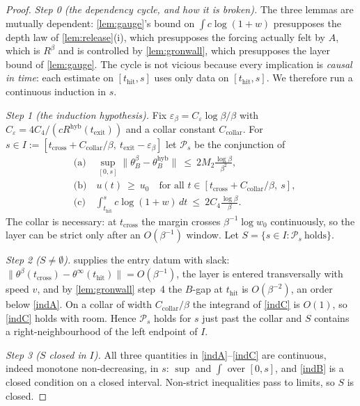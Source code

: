 \documentclass[11pt]{article}
\theoremstyle{definition}
\theoremstyle{remark}
\newcommand{\hyb}{\mathrm{hyb}}
\newcommand{\thit}{t_{\mathrm{hit}}}
\newcommand{\texit}{t_{\mathrm{exit}}}
\newcommand{\tcross}{t_{\mathrm{cross}}}
\begin{document}
\begin{proof}
\emph{Step 0 (the dependency cycle, and how it is broken).} The three lemmas are
mutually dependent: \cref{lem:gauge}'s bound on $\int c\log(1+w)$ presupposes the
depth law of \cref{lem:release}(i), which presupposes the forcing actually felt
by $A$, which is $R^\beta$ and is controlled by \cref{lem:gronwall}, which
presupposes the layer bound of \cref{lem:gauge}. The cycle is not vicious because
every implication is \emph{causal in time}: each estimate on $[\thit,s]$ uses only
data on $[\thit,s]$. We therefore run a continuous induction in $s$.

\emph{Step 1 (the induction hypothesis).} Fix
$\varepsilon_\beta=C_\varepsilon\log\beta/\beta$ with
$C_\varepsilon=4C_4/(cR^{\hyb}(\texit))$ and a collar constant
$C_{\mathrm{collar}}$. For
$s\in I:=[\tcross+C_{\mathrm{collar}}/\beta,\ \texit-\varepsilon_\beta]$ let
$\mathcal P_s$ be the conjunction of
\begin{align}
&\text{(a)}\quad \sup_{[0,s]}\|\theta_B^\beta-\theta_B^{\hyb}\|
\ \le\ 2M_2\frac{\log\beta}{\beta^2},
\tag{a}\label{indA}\\
&\text{(b)}\quad u(t)\ \ge\ u_0\quad\text{for all }
t\in[\tcross+C_{\mathrm{collar}}/\beta,\ s],
\tag{b}\label{indB}\\
&\text{(c)}\quad \int_{\thit}^{s}c\log(1+w)\,dt\ \le\ 2C_4\frac{\log\beta}{\beta}.
\tag{c}\label{indC}
\end{align}
The collar is necessary: at $\tcross$ the margin crosses $\beta^{-1}\log w_0$
continuously, so the layer can be strict only after an $O(\beta^{-1})$ window.
Let $S=\{s\in I:\mathcal P_s\ \text{holds}\}$.

\emph{Step 2 ($S\neq\emptyset$).}  supplies the entry datum
with slack: $\|\theta^\beta(\tcross)-\theta^\infty(\thit)\|=O(\beta^{-1})$, the
layer is entered transversally with speed $v$, and by \cref{lem:gronwall}
step~4 the $B$-gap at $\thit$ is $O(\beta^{-2})$, an order below \eqref{indA}.
On a collar of width $C_{\mathrm{collar}}/\beta$ the integrand of \eqref{indC} is
$O(1)$, so \eqref{indC} holds with room. Hence $\mathcal P_s$ holds for $s$ just
past the collar and $S$ contains a right-neighbourhood of the left endpoint of
$I$.

\emph{Step 3 ($S$ closed in $I$).} All three quantities in
\eqref{indA}--\eqref{indC} are continuous, indeed monotone non-decreasing, in
$s$: $\sup$ and $\int$ over $[0,s]$, and \eqref{indB} is a closed condition on a
closed interval. Non-strict inequalities pass to limits, so $S$ is closed.


\end{proof}
\end{document}
